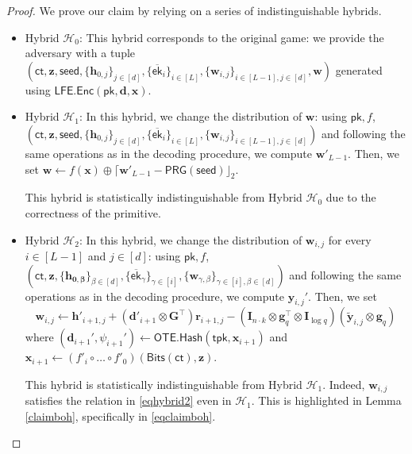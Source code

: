 \documentclass{theoretics}
\newcommand{\ek}{\mathsf{ek}}
\newcommand{\LFE}{\mathsf{LFE}}
\newcommand{\OTE}{\mathsf{OTE}}
\newcommand{\ct}{\mathsf{ct}}
\newcommand{\algofont}[1]{\ensuremath{\mathsf{#1}}}
\newcommand{\tpk}{{\algofont{tpk}}}
\newcommand{\Enc}{{\algofont{Enc}}}
\newcommand{\Hash}{{\algofont{Hash}}}
\newcommand{\id}{\ensuremath{\mathbf{I}}}
\newcommand{\pk}{{\mathsf{pk}}}
\begin{document}
\begin{proof}
We prove our claim by relying on a series of indistinguishable hybrids.

\begin{itemize}
\item Hybrid ${\mathcal{H}_0}$: This hybrid corresponds to the original game: we provide the adversary with a tuple $(\ct, \mathbf{z}, \mathsf{seed}, \{\mathbf{h}_{0, j}\}_{j\in[d]}, \{\overline{\ek}_i\}_{i\in[L]}, \{\mathbf{w}_{i, j}\}_{i\in[L-1], j\in[d]}, \mathbf{w})$ generated using $\LFE.\Enc(\pk, \mathbf d, \mathbf{x})$. 

\item Hybrid ${\mathcal{H}_1}$: In this hybrid, we change the distribution of $\mathbf{w}$: using $\pk, f$, $(\ct, \allowbreak\mathbf{z}, \allowbreak\mathsf{seed}, \allowbreak\{\mathbf{h}_{0, j}\}_{j\in[d]}, \allowbreak\{\overline{\ek}_i\}_{i\in[L]}, \allowbreak\{\mathbf{w}_{i, j}\}_{i\in[L-1], j\in[d]})$ and following the same operations as in the decoding procedure, we compute $\mathbf{w}'_{L-1}$. Then, we set $\mathbf{w}\gets f(\mathbf{x})\oplus \lceil\mathbf{w}'_{L-1}-\mathsf{PRG}(\mathsf{seed})\rfloor_2$.  

This hybrid is statistically indistinguishable from Hybrid ${\mathcal{H}_0}$ due to the correctness of the primitive.

\item Hybrid ${\mathcal{H}_2}$: In this hybrid, we change the distribution of $\mathbf{w}_{i, j}$ for every $i\in[L-1]$ and $j\in[d]$: using $\pk, f$, $(\ct, \mathbf{z}, \{\mathbf{h_{0, \beta}}\}_{\beta\in[d]}, \{\overline{\ek}_\gamma\}_{\gamma\in[i]}, \{\mathbf{w}_{\gamma, \beta}\}_{\gamma\in[i], \beta\in[d]})$ and following the same operations as in the decoding procedure, we compute $\mathbf{y}_{i, j}'$. Then, we set 
\begin{equation}\mathbf{w}_{i,j}\gets \mathbf{h}'_{i+1,j}+(\mathbf d'_{i+1}\otimes \mathbf G^\intercal)\mathbf r_{i+1,j} -(\id_{n\cdot k}\otimes \mathbf g_q^\intercal\otimes \id_{\log q})(\tilde{\mathbf{y}}_{i,j}\otimes \mathbf g_q)\label{eqhybrid2} \end{equation}
where $(\mathbf{d}_{i+1}', \psi_{i+1}')\gets \OTE.\Hash(\tpk, \mathbf{x}_{i+1})$ and $\mathbf{x}_{i+1}\gets (f'_i\circ \dots\circ f'_0)(\mathsf{Bits}(\ct), \mathbf{z})$. 

This hybrid is statistically indistinguishable from Hybrid ${\mathcal{H}_1}$. Indeed, $\mathbf{w}_{i, j}$ satisfies the relation in \eqref{eqhybrid2} even in ${\mathcal{H}_1}$. This is highlighted in Lemma \ref{claimboh}, specifically in \eqref{eqclaimboh}.


\end{itemize}
\end{proof}
\end{document}
